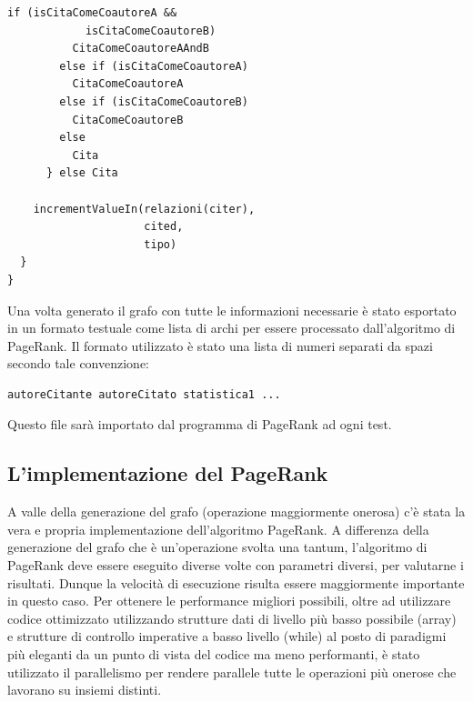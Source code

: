 \documentclass[a4paper, 12pt]{article}
\begin{document}
\begin{enumerate}
\begin{lstlisting}[keepspaces=true]
        if (isCitaComeCoautoreA &&
            isCitaComeCoautoreB)
          CitaComeCoautoreAAndB
        else if (isCitaComeCoautoreA)
          CitaComeCoautoreA
        else if (isCitaComeCoautoreB)
          CitaComeCoautoreB
        else
          Cita
      } else Cita

    incrementValueIn(relazioni(citer), 
                     cited,
                     tipo)
  }
}  
\end{lstlisting}
Una volta generato il grafo con tutte le informazioni necessarie è stato esportato in un formato testuale come lista di archi per essere processato dall'algoritmo di PageRank.
Il formato utilizzato è stato una lista di numeri separati da spazi secondo tale convenzione:
\begin{lstlisting}[keepspaces=true]
autoreCitante autoreCitato statistica1 ...
\end{lstlisting}
Questo file sarà importato dal programma di PageRank ad ogni test.
\end{enumerate}
\subsection{L'implementazione del PageRank}
A valle della generazione del grafo (operazione maggiormente onerosa) c'è stata la vera e propria implementazione dell'algoritmo PageRank.
A differenza della generazione del grafo che è un'operazione svolta una tantum, l'algoritmo di PageRank deve essere eseguito diverse volte con parametri diversi, per valutarne i risultati. Dunque la velocità di esecuzione risulta essere maggiormente importante in questo caso. Per ottenere le performance migliori possibili, oltre ad utilizzare codice ottimizzato utilizzando strutture dati di livello più basso possibile (array) e strutture di controllo imperative a basso livello (while) al posto di paradigmi più eleganti da un punto di vista del codice ma meno performanti, è stato utilizzato il parallelismo per rendere parallele tutte le operazioni più onerose che lavorano su insiemi distinti.
\end{document}

